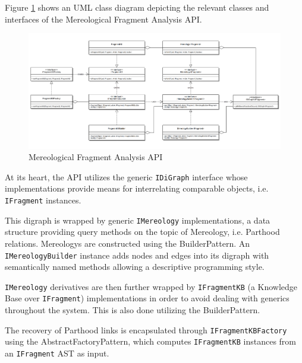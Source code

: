 Figure \ref{figure:MereologicalFragmentAnalysisAPI} shows an \gls{UML} class diagram depicting the relevant classes and interfaces of the Mereological Fragment Analysis \gls{API}.
\begin{figure}[h!]
\begin{center}
\includegraphics[width=\textwidth]{images/MereologicalFragmentAnalysisAPI.png}
\end{center}
\caption{Mereological Fragment Analysis API}
\label{figure:MereologicalFragmentAnalysisAPI}
\end{figure}
At its heart, the \gls{API} utilizes the generic \texttt{IDiGraph} interface whose implementations provide means for interrelating comparable objects, i.e. \texttt{IFragment} instances.

This digraph is wrapped by generic \texttt{IMereology} implementations, a data structure providing query methods on the topic of \gls{Mereology}, i.e. \gls{Parthood} relations.
\Glspl{Mereology} are constructed using the \gls{BuilderPattern}.
An \texttt{IMereology\-Builder} instance adds nodes and edges into its digraph with semantically named methods allowing a descriptive programming style.

\texttt{IMereology} derivatives are then further wrapped by \texttt{IFragmentKB} (a Knowledge Base over \texttt{IFragment}) implementations in order to avoid dealing with generics throughout the system.
This is also done utilizing the \gls{BuilderPattern}.

The recovery of \gls{Parthood} links is encapsulated through \texttt{IFragment\-KB\-Fac\-tory} using the \gls{AbstractFactoryPattern}, which computes \texttt{IFragmentKB} instances from an \texttt{IFragment} \gls{AST} as input.


